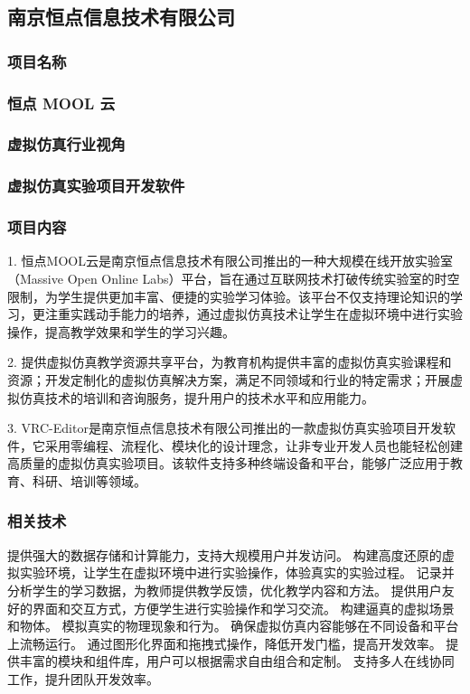 \subsection{南京恒点信息技术有限公司}


\subsubsection{项目名称}

\subsubsection{恒点 MOOL 云}
\subsubsection{虚拟仿真行业视角}
\subsubsection{虚拟仿真实验项目开发软件}

\subsubsection{项目内容}

1. 恒点MOOL云是南京恒点信息技术有限公司推出的一种大规模在线开放实验室（Massive Open Online Labs）平台，旨在通过互联网技术打破传统实验室的时空限制，为学生提供更加丰富、便捷的实验学习体验。该平台不仅支持理论知识的学习，更注重实践动手能力的培养，通过虚拟仿真技术让学生在虚拟环境中进行实验操作，提高教学效果和学生的学习兴趣。

2. 提供虚拟仿真教学资源共享平台，为教育机构提供丰富的虚拟仿真实验课程和资源；开发定制化的虚拟仿真解决方案，满足不同领域和行业的特定需求；开展虚拟仿真技术的培训和咨询服务，提升用户的技术水平和应用能力。

3. VRC-Editor是南京恒点信息技术有限公司推出的一款虚拟仿真实验项目开发软件，它采用零编程、流程化、模块化的设计理念，让非专业开发人员也能轻松创建高质量的虚拟仿真实验项目。该软件支持多种终端设备和平台，能够广泛应用于教育、科研、培训等领域。

\subsubsection{相关技术}

提供强大的数据存储和计算能力，支持大规模用户并发访问。
构建高度还原的虚拟实验环境，让学生在虚拟环境中进行实验操作，体验真实的实验过程。
记录并分析学生的学习数据，为教师提供教学反馈，优化教学内容和方法。
提供用户友好的界面和交互方式，方便学生进行实验操作和学习交流。
构建逼真的虚拟场景和物体。
模拟真实的物理现象和行为。
确保虚拟仿真内容能够在不同设备和平台上流畅运行。
通过图形化界面和拖拽式操作，降低开发门槛，提高开发效率。
提供丰富的模块和组件库，用户可以根据需求自由组合和定制。
支持多人在线协同工作，提升团队开发效率。


